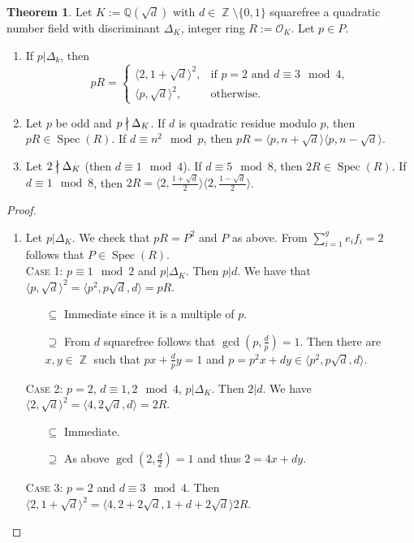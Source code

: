 \documentclass[12pt,a4paper]{report}
\theoremstyle{definition}
\newtheorem{theorem}{Theorem}[chapter] %
\theoremstyle{num.custom-title}
\DeclareMathOperator{\Z}{\mathbb{Z}}
\DeclareMathOperator{\sm}{\setminus}
\DeclareMathOperator{\sse}{\subseteq}
\DeclareMathOperator{\Spec}{Spec}
\newcommand{\Q}{\mathbb{Q}}
\newcommand{\ndivides}{%
  \mathrel{\mkern.5mu %
    \ooalign{\hidewidth$\big|$\hidewidth\cr$\nmid$\cr}%
  }%
}
\renewcommand{\O}{\mathcal{O}}
\begin{document}
\begin{theorem}
Let $K:=\Q(\sqrt{d})$ with $d \in \Z \sm \{0,1\}$ squarefree a quadratic number field with discriminant $\Delta_K$, integer ring $R:=\O_K$. Let $p \in P$.
\begin{enumerate}
\item If $p|\Delta_k$, then
\[
pR = 
\begin{cases}
\langle 2, 1+\sqrt{d} \rangle^2, & \text{if $p=2$ and $d \equiv 3 \mod 4$}, \\
\langle p,\sqrt{d} \rangle^2, &\text{otherwise}.
\end{cases}
\]
\item Let $p$ be odd and $p \ndivides \Delta_K$. If $d$ is quadratic residue modulo $p$, then $pR \in \Spec(R)$. If $d \equiv n^2 \mod p$, then $pR = \langle p, n+\sqrt{d} \rangle \langle p, n-\sqrt{d} \rangle$.
\item Let $2 \ndivides \Delta_K$ (then $d \equiv 1 \mod 4$). If $d \equiv 5 \mod 8$, then $2R \in \Spec(R)$. If $d \equiv 1 \mod 8$, then $2R = \langle 2, \frac{1+\sqrt{d}}{2} \rangle \langle 2, \frac{1-\sqrt{d}}{2} \rangle$.
\end{enumerate}
\begin{proof}\ 
\begin{enumerate}
\item Let $p|\Delta_K$. We check that $pR=P^2$ and $P$ as above. From $\sum_{i=1}^g e_i f_i = 2$ follows that $P \in \Spec(R)$.\\
\textsc{Case 1:} $p \equiv 1 \mod 2$ and $p|\Delta_K$. Then $p|d$. We have that $\langle p,\sqrt{d} \rangle^2 = \langle p^2, p\sqrt{d},d \rangle = pR$.
\begin{itemize}
\item[$\sse$] Immediate since it is a multiple of $p$.
\item[$\supseteq$] From $d$ squarefree follows that $\gcd(p,\frac{d}{p})=1$. Then there are $x,y \in \Z$ such that $px+\frac{d}{p}y=1$ and $p=p^2 x + dy \in \langle p^2, p\sqrt{d},d \rangle$.
\end{itemize}
\textsc{Case 2:} $p=2$, $d \equiv 1,2 \mod 4$, $p|\Delta_K$. Then $2|d$. We have $\langle 2,\sqrt{d} \rangle^2 = \langle 4, 2\sqrt{d}, d \rangle = 2R$.
\begin{itemize}
\item[$\sse$] Immediate.
\item[$\supseteq$] As above $\gcd(2,\frac{d}{2})=1$ and thus $2=4x+dy$.
\end{itemize}
\textsc{Case 3:} $p=2$ and $d \equiv 3 \mod 4$. Then $\langle 2, 1+\sqrt{d} \rangle^2 = \langle 4, 2+2\sqrt{d}, 1+d+2\sqrt{d} \rangle 2R$.

\end{enumerate}
\end{proof}
\end{theorem}
\end{document}
